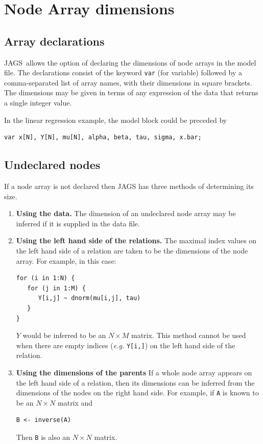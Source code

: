 \documentclass[11pt, a4paper, titlepage]{report}
\newcommand{\JAGS}{\textsf{JAGS}}
\begin{document}
\section{Node Array dimensions}

\subsection{Array declarations}

\JAGS\ allows the option of declaring the dimensions of node arrays in
the model file. The declarations consist of the keyword \texttt{var}
(for variable) followed by a comma-separated list of array names, with
their dimensions in square brackets. The dimensions may be given in
terms of any expression of the data that returns a single integer
value.

In the linear regression example, the model block could be preceded by
\begin{verbatim}
var x[N], Y[N], mu[N], alpha, beta, tau, sigma, x.bar;
\end{verbatim}

\subsection{Undeclared nodes}
\label{subsection:undeclared}

If a node array is not declared then JAGS has three methods of
determining its size.
\begin{enumerate}
\item {\bf Using the data.}  The dimension of an undeclared node array
  may be inferred if it is supplied in the data file.
\item {\bf Using the left hand side of the relations.}  The maximal
  index values on the left hand side of a relation are taken to be the
  dimensions of the node array.  For example, in this case:
\begin{verbatim}
for (i in 1:N) {
   for (j in 1:M) {
      Y[i,j] ~ dnorm(mu[i,j], tau)
   }
}
\end{verbatim}
$Y$ would be inferred to be an $N \times M$ matrix. This method cannot 
be used when there are empty indices ({\em e.g.} \verb+Y[i,]+) on the left
hand side of the relation.
\item {\bf Using the dimensions of the parents} If a whole node array
  appears on the left hand side of a relation, then its dimensions can
  be inferred from the dimensions of the nodes on the right hand side.
  For example, if \verb+A+ is known to be an $N \times N$ matrix
  and
\begin{verbatim}
B <- inverse(A)
\end{verbatim}
Then \verb+B+ is also an $N \times N$ matrix.
\end{enumerate}
\end{document}
